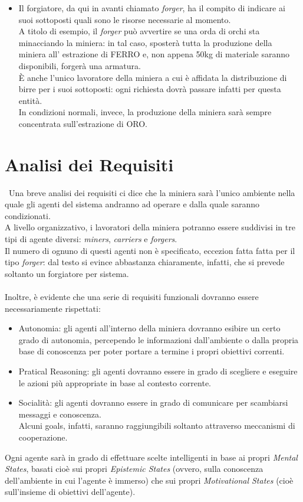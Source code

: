 \documentclass{llncs}
\begin{document}
\begin{itemize}
\item Il forgiatore, da qui in avanti chiamato \textit{forger}, ha il compito di indicare ai suoi sottoposti quali sono le risorse necessarie al momento.\\
A titolo di esempio, il \textit{forger} può avvertire se una orda di orchi sta minacciando la miniera: in tal caso, sposterà tutta la produzione della miniera all' estrazione di FERRO e, non appena 50kg di materiale saranno disponibili, forgerà una armatura.\\
È anche l'unico lavoratore della miniera a cui è affidata la distribuzione di birre per i suoi sottoposti: ogni richiesta dovrà passare infatti per questa entità.\\
In condizioni normali, invece, la produzione della miniera sarà sempre concentrata sull'estrazione di ORO.
\end{itemize}
\newpage
\section{Analisi dei Requisiti}\
Una breve analisi dei requisiti ci dice che la miniera sarà l'unico ambiente nella quale gli agenti del sistema andranno ad operare e dalla quale saranno condizionati.\\
A livello organizzativo, i lavoratori della miniera potranno essere suddivisi in tre tipi di agente diversi: \textit{miners}, \textit{carriers} e \textit{forgers}.\\Il numero di ognuno di questi agenti non è specificato, eccezion fatta fatta per il tipo \textit{forger}: dal testo si evince abbastanza chiaramente, infatti, che si prevede soltanto un forgiatore per sistema.\\\\
Inoltre, è evidente che una serie di requisiti funzionali dovranno essere necessariamente rispettati:
\begin{itemize}
\item Autonomia: gli agenti all'interno della miniera dovranno esibire un certo grado di autonomia, percependo le informazioni dall'ambiente o dalla propria base di conoscenza per poter portare a termine i propri obiettivi correnti.\\
\item Pratical Reasoning: gli agenti dovranno essere in grado di scegliere e eseguire le azioni più appropriate in base al contesto corrente.\\
\item Socialità: gli agenti dovranno essere in grado di comunicare per scambiarsi messaggi e conoscenza.\\
Alcuni goals, infatti, saranno raggiungibili soltanto attraverso meccanismi di cooperazione.
\end{itemize}
Ogni agente sarà in grado di effettuare scelte intelligenti in base ai propri \textit{Mental States}, basati cioè sui propri \textit{Epistemic States} (ovvero, sulla conoscenza dell'ambiente in cui l'agente è immerso) che sui propri \textit{Motivational States} (cioè sull'insieme di obiettivi dell'agente).
\newpage
\end{document}
